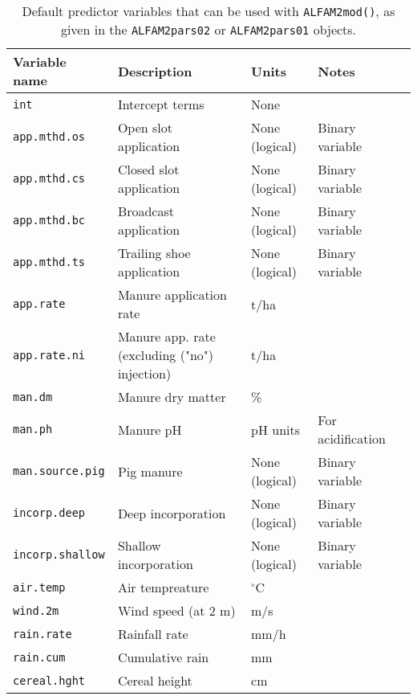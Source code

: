 \documentclass{article}
\begin{document}
\begin{table}[]
  \caption{Default predictor variables that can be used with \texttt{ALFAM2mod()}, as given in the \texttt{ALFAM2pars02} or \texttt{ALFAM2pars01} objects.}
\begin{tabular}{lllll}
\hline
Variable name & Description             & Units          & Notes             &  \\
\hline
  \texttt{int}           & Intercept terms         & None           &                   &  \\
  \texttt{app.mthd.os}  & Open slot application   & None (logical) & Binary variable   &  \\
  \texttt{app.mthd.cs}  & Closed slot application   & None (logical) & Binary variable   &  \\
  \texttt{app.mthd.bc}  & Broadcast application   & None (logical) & Binary variable   &  \\
  \texttt{app.mthd.ts}  & Trailing shoe application   & None (logical) & Binary variable   &  \\
  \texttt{app.rate}      & Manure application rate & t/ha           &                   &  \\
  \texttt{app.rate.ni}   & Manure app. rate (excluding ("no") injection) & t/ha           &                   &  \\
  \texttt{man.dm}        & Manure dry matter       & \%             &                   &  \\
  \texttt{man.ph}        & Manure pH               & pH units       & For acidification &  \\
  \texttt{man.source.pig}        & Pig manure    & None (logical)  & Binary variable    &  \\
\texttt{incorp.deep}    & Deep incorporation      & None (logical) & Binary variable   &  \\
\texttt{incorp.shallow} & Shallow incorporation   & None (logical) & Binary variable   &  \\
  \texttt{air.temp}      & Air tempreature         & $^\circ$C      &                   &  \\
  \texttt{wind.2m}       & Wind speed (at 2 m)     & m/s            &                   &  \\
  \texttt{rain.rate}     & Rainfall rate           & mm/h           &                   &  \\
  \texttt{rain.cum}      & Cumulative rain         & mm             &                   &  \\
  \texttt{cereal.hght}      & Cereal height         & cm             &                   &  \\
\hline
\end{tabular}
\end{table}
\end{document}
